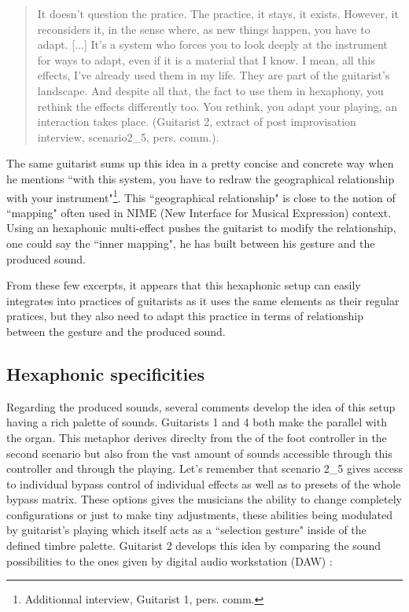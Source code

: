 \documentclass{article}
\begin{document}
    \begin{quote}
     It doesn't question the pratice. The practice, it stays, it exists. However, it reconsiders it, in the sense where, as new things happen, you have to adapt. [...] It's a system who forces you to look deeply at the instrument for ways to adapt, even if it is a material that I know. I mean, all this effects, I've already used them in my life. They are part of the guitarist's landscape. And despite all that, the fact to use them in hexaphony, you rethink the effects differently too. You rethink, you adapt your playing, an interaction takes place. (Guitarist 2, extract of post improvisation interview, scenario2\_5, pers. comm.).
    \end{quote}

The same guitarist sums up this idea in a pretty concise and concrete way when he mentions ``with this system, you have to redraw the geographical relationship with your instrument"\footnote{Additionnal interview, Guitarist 1, pers. comm.}. This ``geographical relationship" is close to the notion of ``mapping" often used in NIME (New Interface for Musical Expression) context. Using an hexaphonic multi-effect pushes the guitarist to modify the relationship, one could say the ``inner mapping", he has built between his gesture and the produced sound. 

From these few excerpts, it appears that this hexaphonic setup can easily integrates into practices of guitarists as it uses the same elements as their regular pratices, but they also need to adapt this practice in terms of relationship between the gesture and the produced sound.




\subsection{Hexaphonic specificities}

Regarding the produced sounds, several comments develop the idea of this setup having a rich palette of sounds. Guitarists 1 and 4 both make the parallel with the organ. This metaphor derives direclty from the of the foot controller in the second scenario but also from the vast amount of sounds accessible through this controller  and through the playing.  Let's remember that scenario 2\_5 gives access to individual bypass control of individual effects as well as to presets of the whole bypass matrix. These options gives the musicians the ability to change completely configurations or just to make tiny adjustments, these abilities being modulated by guitarist's playing which itself acts as a ``selection gesture" \cite{sci:Cadoz94} inside of the defined timbre palette.
Guitarist 2 develops this idea by comparing the sound possibilities to the ones given by digital audio workstation (DAW) : 
\end{document}
